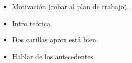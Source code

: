 \documentclass[../main.tex]{subfiles}
\begin{document}
\begin{itemize}
	\item Motivación (robar al plan de trabajo).
	\item Intro teórica.
	\item Dos carillas aprox está bien.
	\item Hablar de los antecedentes.
\end{itemize}
\end{document}
